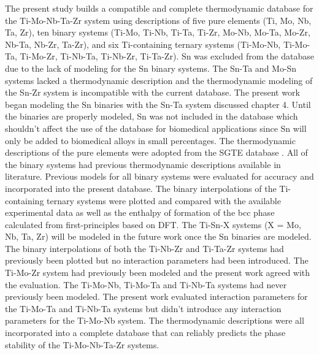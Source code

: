 The present study builds a compatible and complete thermodynamic database for the Ti-Mo-Nb-Ta-Zr system using descriptions of five pure elements (Ti, Mo, Nb, Ta, Zr), ten binary systems (Ti-Mo, Ti-Nb, Ti-Ta, Ti-Zr, Mo-Nb, Mo-Ta, Mo-Zr, Nb-Ta, Nb-Zr, Ta-Zr), and six Ti-containing ternary systems (Ti-Mo-Nb, Ti-Mo-Ta, Ti-Mo-Zr, Ti-Nb-Ta, Ti-Nb-Zr, Ti-Ta-Zr). Sn was excluded from the database due to the lack of modeling for the Sn binary systems. The Sn-Ta and Mo-Sn systems lacked a thermodynamic description and the thermodynamic modeling of the Sn-Zr system is incompatible with the current database. The present work began modeling the Sn binaries with the Sn-Ta system discussed chapter 4. Until the binaries are properly modeled, Sn was not included in the database which shouldn't affect the use of the database for biomedical applications since Sn will only be added to biomedical alloys in small percentages. The thermodynamic descriptions of the pure elements were adopted from the SGTE database \cite{Dinsdale1991}. All of the binary systems had previous thermodynamic descriptions available in literature. Previous models for all binary systems were evaluated for accuracy and incorporated into the present database. The binary interpolations of the Ti-containing ternary systems were plotted and compared with the available experimental data as well as the enthalpy of formation of the bcc phase calculated from first-principles based on DFT. The Ti-Sn-X systems (X = Mo, Nb, Ta, Zr) will be modeled in the future work once the Sn binaries are modeled. The binary interpolations of both the Ti-Nb-Zr and Ti-Ta-Zr systems had previously been plotted but no interaction parameters had been introduced. The Ti-Mo-Zr system had previously been modeled and the present work agreed with the evaluation. The Ti-Mo-Nb, Ti-Mo-Ta and Ti-Nb-Ta systems had never previously been modeled. The present work evaluated interaction parameters for the Ti-Mo-Ta and Ti-Nb-Ta systems but didn't introduce any interaction parameters for the Ti-Mo-Nb system. The thermodynamic descriptions were all incorporated into a complete database that can reliably predicts the phase stability of the Ti-Mo-Nb-Ta-Zr systems.


